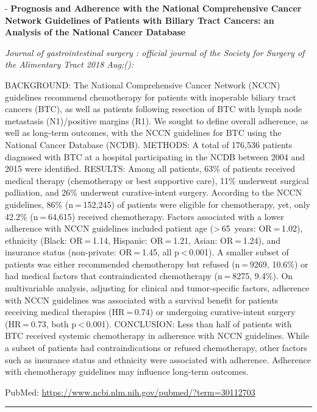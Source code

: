 \documentclass[]{article}
\begin{document}
 - \textbf{Prognosis and Adherence with the National Comprehensive
Cancer Network Guidelines of Patients with Biliary Tract Cancers: an
Analysis of the National Cancer Database}

\emph{Journal of gastrointestinal surgery : official journal of the
Society for Surgery of the Alimentary Tract 2018 Aug;():}

BACKGROUND: The National Comprehensive Cancer Network (NCCN) guidelines
recommend chemotherapy for patients with inoperable biliary tract
cancers (BTC), as well as patients following resection of BTC with lymph
node metastasis (N1)/positive margins (R1). We sought to define overall
adherence, as well as long-term outcomes, with the NCCN guidelines for
BTC using the National Cancer Database (NCDB). METHODS: A total of
176,536 patients diagnosed with BTC at a hospital participating in the
NCDB between 2004 and 2015 were identified. RESULTS: Among all patients,
63\% of patients received medical therapy (chemotherapy or best
supportive care), 11\% underwent surgical palliation, and 26\% underwent
curative-intent surgery. According to the NCCN guidelines, 86\%
(n = 152,245) of patients were eligible for chemotherapy, yet, only
42.2\% (n = 64,615) received chemotherapy. Factors associated with a
lower adherence with NCCN guidelines included patient age
(\textgreater{} 65~years: OR = 1.02), ethnicity (Black: OR = 1.14,
Hispanic: OR = 1.21, Asian: OR = 1.24), and insurance status
(non-private: OR = 1.45, all p \textless{} 0.001). A smaller subset of
patients was either recommended chemotherapy but refused (n = 9269,
10.6\%) or had medical factors that contraindicated chemotherapy
(n = 8275, 9.4\%). On multivariable analysis, adjusting for clinical and
tumor-specific factors, adherence with NCCN guidelines was associated
with a survival benefit for patients receiving medical therapies
(HR = 0.74) or undergoing curative-intent surgery (HR = 0.73, both
p \textless{} 0.001). CONCLUSION: Less than half of patients with BTC
received systemic chemotherapy in adherence with NCCN guidelines. While
a subset of patients had contraindications or refused chemotherapy,
other factors such as insurance status and ethnicity were associated
with adherence. Adherence with chemotherapy guidelines may influence
long-term outcomes.

PubMed: \url{https://www.ncbi.nlm.nih.gov/pubmed/?term=30112703}

{}

{}

\begin{center}\rule{0.5\linewidth}{\linethickness}\end{center}
\end{document}
